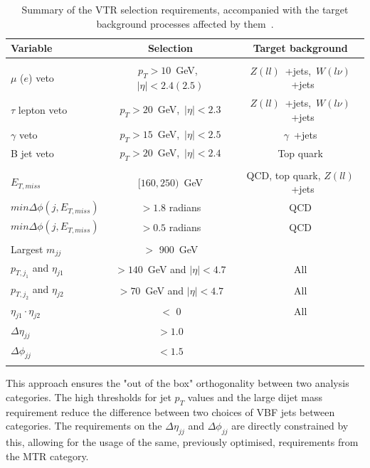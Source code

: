 \begin{table}[htbp]
\centering
\begin{tabular}{lcc}
    Variable                           & Selection                       & Target background \\
    \hline
     & & \\
    $\mu$ ($e$) veto               & $p_T > 10$~GeV,~$|\eta| < 2.4 (2.5)$  & $Z(ll)$~+jets,~$W(l\nu)$~+jets \\
    $\tau$ lepton veto                 & $p_T > 20$~GeV,~$|\eta| < 2.3$        & $Z(ll)$~+jets,~$W(l\nu)$~+jets  \\
    $\gamma$ veto                        & $p_T > 15$~GeV,~$|\eta| < 2.5$        & $\gamma$~+jets \\
    B jet veto                    &  $p_T > 20$~GeV,~$|\eta| < 2.4$  &  Top quark\\
        & & \\
    $E_{T,miss}$                          & $[160,250)$~GeV                          & QCD, top quark, $Z(ll)$~+jets \\
    $min\Delta\phi(j, E_{T,miss})$   &  $ {>} 1.8$ radians               & QCD \\
    $min\Delta\phi(j, E_{T,miss})$   &  $ {>} 0.5$ radians               & QCD \\
        & & \\
    Largest $m_{jj}$                               & ${>}$ 900~GeV  \\       
    $p_{T,j_1}$ and $\eta_{j1}$   & ${>} 140$~GeV and $ |\eta| < 4.7$      & All \\
    $p_{T,j_2}$ and $\eta_{j2}$   & ${>} 70$~GeV and $ |\eta| < 4.7$      & All \\
    $\eta_{j1}\cdot\eta_{j2}$   & ${<}$ 0   & All \\
    $\Delta\eta_{jj}$                            & ${>} 1.0$  \\
    $\Delta\phi_{jj}$                            & ${<} 1.5$  \\
      & & \\
         \hline
\end{tabular}
\caption{Summary of the VTR selection requirements, accompanied with the target background processes affected by them~\cite{note:AN_19_257}.}
\label{tab:selection_vtr}
\end{table}

\hspace{10pt} This approach ensures the "out of the box" orthogonality between two analysis categories. The high thresholds for jet $p_T$ values and the large dijet mass requirement reduce the difference between two choices of VBF jets between categories. The requirements on the $\Delta\eta_{jj}$ and $\Delta\phi_{jj}$ are directly constrained by this, allowing for the usage of the same, previously optimised, requirements from the MTR category.

